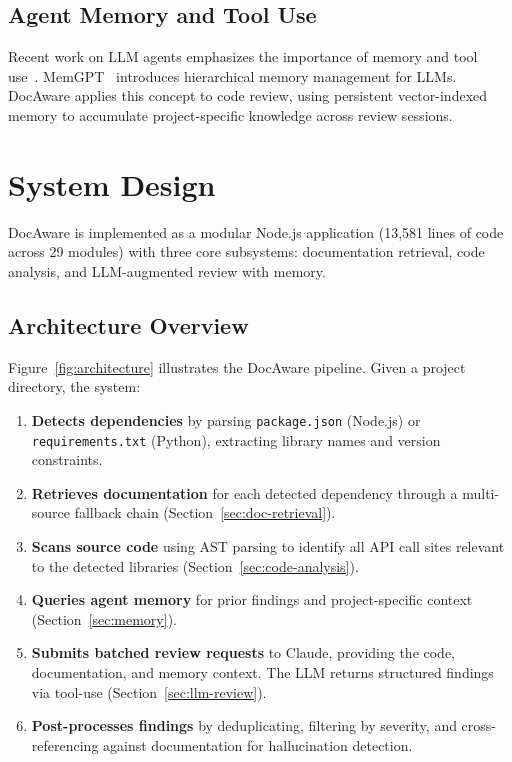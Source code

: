 \documentclass[sigconf,nonacm]{acmart}
\begin{document}
\subsection{Agent Memory and Tool Use}

Recent work on LLM agents emphasizes the importance of memory and tool use~\cite{park2023generative,schick2023toolformer}. MemGPT~\cite{packer2023memgpt} introduces hierarchical memory management for LLMs. DocAware applies this concept to code review, using persistent vector-indexed memory to accumulate project-specific knowledge across review sessions.

\section{System Design}
\label{sec:system}

DocAware is implemented as a modular Node.js application (13,581 lines of code across 29 modules) with three core subsystems: documentation retrieval, code analysis, and LLM-augmented review with memory.

\subsection{Architecture Overview}

Figure~\ref{fig:architecture} illustrates the DocAware pipeline. Given a project directory, the system:

\begin{enumerate}
    \item \textbf{Detects dependencies} by parsing \texttt{package.json} (Node.js) or \texttt{requirements.txt} (Python), extracting library names and version constraints.
    \item \textbf{Retrieves documentation} for each detected dependency through a multi-source fallback chain (Section~\ref{sec:doc-retrieval}).
    \item \textbf{Scans source code} using AST parsing to identify all API call sites relevant to the detected libraries (Section~\ref{sec:code-analysis}).
    \item \textbf{Queries agent memory} for prior findings and project-specific context (Section~\ref{sec:memory}).
    \item \textbf{Submits batched review requests} to Claude, providing the code, documentation, and memory context. The LLM returns structured findings via tool-use (Section~\ref{sec:llm-review}).
    \item \textbf{Post-processes findings} by deduplicating, filtering by severity, and cross-referencing against documentation for hallucination detection.
\end{enumerate}
\end{document}
